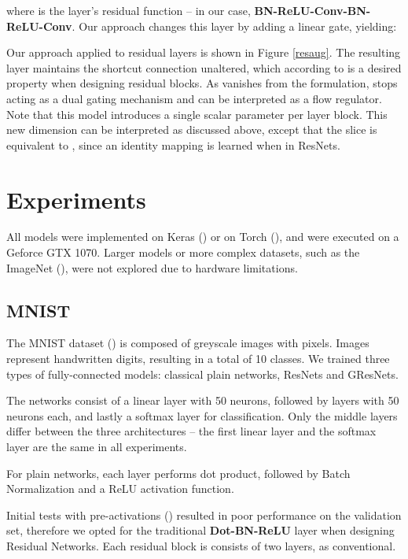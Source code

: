\documentclass{article} \RequirePackage{amsmath,amsthm,amsfonts,amssymb}
\begin{document}
where  is the layer's residual function -- in our case, \textbf{BN-ReLU-Conv-BN-ReLU-Conv}. Our approach changes this layer by adding a linear gate, yielding:



Our approach applied to residual layers is shown in Figure \ref{resaug}. The resulting layer maintains the shortcut connection unaltered, which according to \cite{resnet2} is a desired property when designing residual blocks. As  vanishes from the formulation,  stops acting as a dual gating mechanism and can be interpreted as a flow regulator. Note that this model introduces a single scalar parameter per layer block. This new dimension can be interpreted as discussed above, except that the slice  is equivalent to , since an identity mapping is learned when  in ResNets.





\section{Experiments}

All models were implemented on Keras (\cite{keras}) or on Torch (\cite{t7}), and were executed on a Geforce GTX 1070. Larger models or more complex datasets, such as the ImageNet (\cite{imagenet}), were not explored due to hardware limitations.

\subsection{MNIST}

The MNIST dataset (\cite{mnist}) is composed of  greyscale images with  pixels. Images represent handwritten digits, resulting in a total of 10 classes. We trained three types of fully-connected models: classical plain networks, ResNets and GResNets.

The networks consist of a linear layer with 50 neurons, followed by  layers with 50 neurons each, and lastly a softmax layer for classification. Only the  middle layers differ between the three architectures -- the first linear layer and the softmax layer are the same in all experiments.

For plain networks, each layer performs dot product, followed by Batch Normalization and a ReLU activation function.

Initial tests with pre-activations (\cite{resnet2}) resulted in poor performance on the validation set, therefore we opted for the traditional \textbf{Dot-BN-ReLU} layer when designing Residual Networks. Each residual block is consists of two layers, as conventional.
\end{document}
